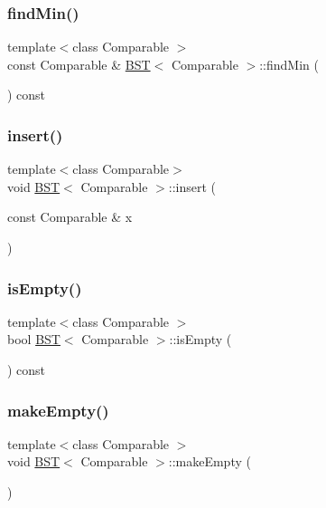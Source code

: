 \mbox{\label{class_b_s_t_aa52491ff35aec517961937a17a9fa493}} 
\subsubsection{\texorpdfstring{find\+Min()}{findMin()}}
{\footnotesize\ttfamily template$<$class Comparable $>$ \\
const Comparable \& \hyperlink{class_b_s_t}{B\+ST}$<$ Comparable $>$\+::find\+Min (\begin{DoxyParamCaption}{ }\end{DoxyParamCaption}) const}

\mbox{\label{class_b_s_t_a2b117df6521c7d61dac75ff2c938bae7}} 
\subsubsection{\texorpdfstring{insert()}{insert()}}
{\footnotesize\ttfamily template$<$class Comparable$>$ \\
void \hyperlink{class_b_s_t}{B\+ST}$<$ Comparable $>$\+::insert (\begin{DoxyParamCaption}\item[{const Comparable \&}]{x }\end{DoxyParamCaption})}

\mbox{\label{class_b_s_t_a10fd737b2be62437023407fdc123f728}} 
\subsubsection{\texorpdfstring{is\+Empty()}{isEmpty()}}
{\footnotesize\ttfamily template$<$class Comparable $>$ \\
bool \hyperlink{class_b_s_t}{B\+ST}$<$ Comparable $>$\+::is\+Empty (\begin{DoxyParamCaption}{ }\end{DoxyParamCaption}) const}

\mbox{\label{class_b_s_t_a050d829503a88714c4ad0773cf6d3af6}} 
\subsubsection{\texorpdfstring{make\+Empty()}{makeEmpty()}}
{\footnotesize\ttfamily template$<$class Comparable $>$ \\
void \hyperlink{class_b_s_t}{B\+ST}$<$ Comparable $>$\+::make\+Empty (\begin{DoxyParamCaption}{ }\end{DoxyParamCaption})}

